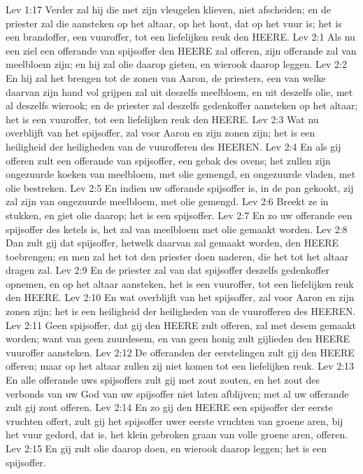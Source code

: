 Lev 1:17  Verder zal hij die met zijn vleugelen klieven, niet afscheiden; en de priester zal die aansteken op het altaar, op het hout, dat op het vuur is; het is een brandoffer, een vuuroffer, tot een liefelijken reuk den HEERE.
Lev 2:1  Als nu een ziel een offerande van spijsoffer den HEERE zal offeren, zijn offerande zal van meelbloem zijn; en hij zal olie daarop gieten, en wierook daarop leggen.
Lev 2:2  En hij zal het brengen tot de zonen van Aaron, de priesters, een van welke daarvan zijn hand vol grijpen zal uit deszelfs meelbloem, en uit deszelfs olie, met al deszelfs wierook; en de priester zal deszelfs gedenkoffer aansteken op het altaar; het is een vuuroffer, tot een liefelijken reuk den HEERE.
Lev 2:3  Wat nu overblijft van het spijsoffer, zal voor Aaron en zijn zonen zijn; het is een heiligheid der heiligheden van de vuurofferen des HEEREN.
Lev 2:4  En als gij offeren zult een offerande van spijsoffer, een gebak des ovens; het zullen zijn ongezuurde koeken van meelbloem, met olie gemengd, en ongezuurde vladen, met olie bestreken.
Lev 2:5  En indien uw offerande spijsoffer is, in de pan gekookt, zij zal zijn van ongezuurde meelbloem, met olie gemengd.
Lev 2:6  Breekt ze in stukken, en giet olie daarop; het is een spijsoffer.
Lev 2:7  En zo uw offerande een spijsoffer des ketels is, het zal van meelbloem met olie gemaakt worden.
Lev 2:8  Dan zult gij dat spijsoffer, hetwelk daarvan zal gemaakt worden, den HEERE toebrengen; en men zal het tot den priester doen naderen, die het tot het altaar dragen zal.
Lev 2:9  En de priester zal van dat spijsoffer deszelfs gedenkoffer opnemen, en op het altaar aansteken, het is een vuuroffer, tot een liefelijken reuk den HEERE.
Lev 2:10  En wat overblijft van het spijsoffer, zal voor Aaron en zijn zonen zijn; het is een heiligheid der heiligheden van de vuurofferen des HEEREN.
Lev 2:11  Geen spijsoffer, dat gij den HEERE zult offeren, zal met desem gemaakt worden; want van geen zuurdesem, en van geen honig zult gijlieden den HEERE vuuroffer aansteken.
Lev 2:12  De offeranden der eerstelingen zult gij den HEERE offeren; maar op het altaar zullen zij niet komen tot een liefelijken reuk.
Lev 2:13  En alle offerande uws spijsoffers zult gij met zout zouten, en het zout des verbonds van uw God van uw spijsoffer niet laten afblijven; met al uw offerande zult gij zout offeren.
Lev 2:14  En zo gij den HEERE een spijsoffer der eerste vruchten offert, zult gij het spijsoffer uwer eerste vruchten van groene aren, bij het vuur gedord, dat is, het klein gebroken graan van volle groene aren, offeren.
Lev 2:15  En gij zult olie daarop doen, en wierook daarop leggen; het is een spijsoffer.
